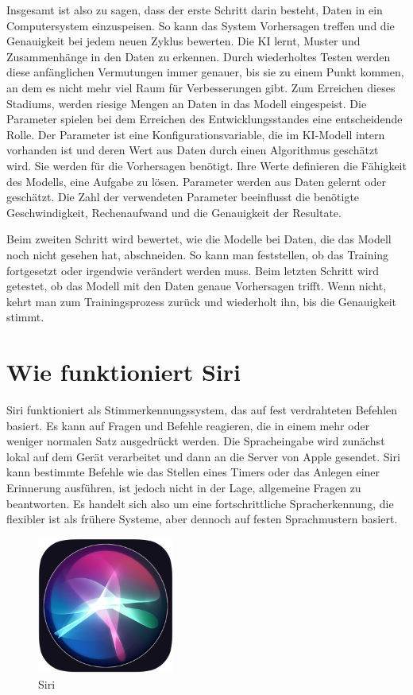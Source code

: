 \documentclass{article}
\begin{document}
Insgesamt ist also zu sagen, dass der erste Schritt darin besteht, Daten in ein Computersystem einzuspeisen. So kann das System Vorhersagen treffen und die Genauigkeit bei jedem neuen Zyklus bewerten. Die KI lernt, Muster und Zusammenhänge in den Daten zu erkennen. Durch wiederholtes Testen werden diese anfänglichen Vermutungen immer genauer, bis sie zu einem Punkt kommen, an dem es nicht mehr viel Raum für Verbesserungen gibt. Zum Erreichen dieses Stadiums, werden riesige Mengen an Daten in das Modell eingespeist. Die Parameter spielen bei dem Erreichen des Entwicklungsstandes eine entscheidende Rolle. Der Parameter ist eine Konfigurationsvariable, die im KI-Modell intern vorhanden ist und deren Wert aus Daten durch einen Algorithmus geschätzt wird. Sie werden für die Vorhersagen benötigt. Ihre Werte definieren die Fähigkeit des Modells, eine Aufgabe zu lösen. Parameter werden aus Daten gelernt oder geschätzt. Die Zahl der verwendeten Parameter beeinflusst die benötigte Geschwindigkeit, Rechenaufwand und die Genauigkeit der Resultate. 


Beim zweiten Schritt wird bewertet, wie die Modelle bei Daten, die das Modell noch nicht gesehen hat, abschneiden. So kann man feststellen, ob das Training fortgesetzt oder irgendwie verändert werden muss. 
Beim letzten Schritt wird getestet, ob das Modell mit den Daten genaue Vorhersagen trifft. Wenn nicht, kehrt man zum Trainingsprozess zurück und wiederholt ihn, bis die Genauigkeit stimmt.


\section{Wie funktioniert Siri}
Siri funktioniert als Stimmerkennungssystem, das auf fest verdrahteten Befehlen basiert. Es kann auf Fragen und Befehle reagieren, die in einem mehr oder weniger normalen Satz ausgedrückt werden. Die Spracheingabe wird zunächst lokal auf dem Gerät verarbeitet und dann an die Server von Apple gesendet. Siri kann bestimmte Befehle wie das Stellen eines Timers oder das Anlegen einer Erinnerung ausführen, ist jedoch nicht in der Lage, allgemeine Fragen zu beantworten. Es handelt sich also um eine fortschrittliche Spracherkennung, die flexibler ist als frühere Systeme, aber dennoch auf festen Sprachmustern basiert.


\begin{figure}[ht]
    \centering
    \includegraphics[width=0.4\textwidth]{siri.jpg}
    \caption{Siri}
    \label{fig:siri}
    \end{figure}
\end{document}
